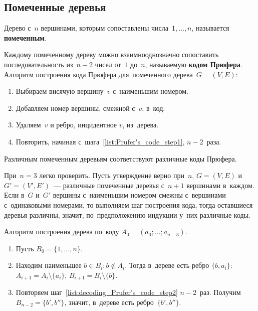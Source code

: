 \subsection{Помеченные деревья}
Дерево с~$n$ вершинами, которым сопоставлены числа~$1, \ldots, n$, называется \textbf{помеченным}.

Каждому помеченному дереву можно взаимнооднозначно сопоставить последовательность из~${n - 2}$ чисел от~$1$ до~$n$, называемую \textbf{кодом Прюфера}.
Алгоритм построения кода Прюфера для~помеченного дерева~$G = (V, E)$:
\begin{enumerate}
	\item\label{list:Prufer's_code_step1} Выбираем висячую вершину~$v$ с~наименьшим номером.
	\item Добавляем номер вершины, смежной с~$v$, в~код.
	\item Удаляем~$v$ и ребро, инцидентное $v$, из~дерева.
	\item Повторить, начиная с~шага~\ref{list:Prufer's_code_step1}, $n - 2$~раза.
\end{enumerate}

\begin{statement}
\label{st:matching_of_codes_to_trees}
Различным помеченным деревьям соответствуют различные коды Прюфера.
\end{statement}
\begin{proofmathind}
	\indbase При~$n = 3$ легко проверить.
	\indstep Пусть утверждение верно при~$n$, $G = (V, E)$ и~$G' = (V', E')$~--- различные помеченные деревья с~$n + 1$ вершинами в~каждом.
	Если в~$G$ и~$G'$ вершины с~наименьшим номером смежны с~вершинами с~одинаковыми номерами, то выполняем шаг построения кода, тогда оставшиеся деревья различны, значит, по~предположению индукции у~них различные коды. \indend
\end{proofmathind}

Алгоритм построения дерева по~коду $A_0 = (a_0; \ldots; a_{n-3})$.
\begin{enumerate}
	\item Пусть $B_0 = \{ 1, \ldots, n \}$.
	\item\label{list:decoding_Prufer's_code_step2} Находим наименьшее $b \in B_i \colon b \notin A_i$.
	Тогда в~дереве есть ребро $\{ b, a_i \}$: $A_{i+1} = A_i \setminus \{ a_i \}$, $B_{i+1} = B_i \setminus \{ b \}$.
	\item Повторяем шаг~\ref{list:decoding_Prufer's_code_step2} $n - 2$~раз.
	Получим $B_{n-2} = \{ b', b'' \}$, значит, в~дереве есть ребро~$\{ b', b'' \}$.
\end{enumerate}

